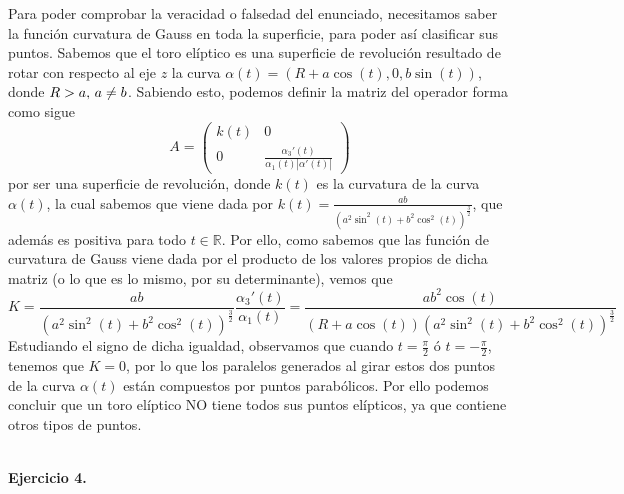 \documentclass[fleqn]{article}
\def\R{\mathds{R}}
\begin{document}
    Para poder comprobar la veracidad o falsedad del enunciado, necesitamos saber la función curvatura de Gauss en toda la superficie, para poder así clasificar sus puntos. Sabemos que el 
    toro elíptico es una superficie de revolución resultado de rotar con respecto al eje $z$ la curva $\alpha(t) = (R + a\cos(t), 0, b\sin(t))$, donde $R>a, \thinspace a \neq b$. Sabiendo esto,
    podemos definir la matriz del operador forma como sigue 
    $$A=
    \begin{pmatrix}
        k(t) & 0 \\
        0 & \frac{\alpha_3'(t)}{\alpha_1(t) |\alpha'(t)|}
    \end{pmatrix}
    $$
    por ser una superficie de revolución, donde $k(t)$ es la curvatura de la curva $\alpha(t)$, la cual sabemos que viene dada por $k(t)=\frac{ab}{(a^2\sin^2(t) + b^2 \cos^2(t))^{\frac{3}{2}}}$, que además es positiva
    para todo $t\in \R$. Por ello, como sabemos que las función de curvatura de Gauss viene dada por el producto de los valores propios de dicha matriz (o lo que es lo mismo, por su determinante), vemos que
    $$K = \frac{ab}{(a^2\sin^2(t) + b^2 \cos^2(t))^{\frac{3}{2}}} \frac{\alpha_3'(t)}{\alpha_1(t)} = \frac{ab^2 \cos(t)}{(R + a\cos(t))(a^2\sin^2(t) + b^2 \cos^2(t))^{\frac{3}{2}}}$$
    Estudiando el signo de dicha igualdad, observamos que cuando $t=\frac{\pi}{2}$ ó $t=-\frac{\pi}{2}$, tenemos que $K=0$, por lo que los paralelos generados al girar estos dos puntos
    de la curva $\alpha(t)$ están compuestos por puntos parabólicos. Por ello podemos concluir que un toro elíptico NO tiene todos sus puntos elípticos, ya que contiene otros 
    tipos de puntos. \\ \\

    \newpage

    \textbf{Ejercicio 4. } \\
   
\end{document}
